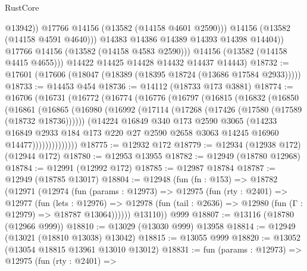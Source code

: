 \begin{lexlean}{RustCore}
\begin{coremodule}
                      @13942))
                  @17766
                  @14156
                  (@13582 (@14158 @4601 @2590)))
                @14156
                (@13582 (@14158 @4591 @4640)))
              @14383
              @14386
              @14389
              @14393
              @14398
              @14404))
          @17766
          @14156
          (@13582 (@14158 @4583 @2590)))
        @14156
        (@13582 (@14158 @4415 @4655)))
      @14422
      @14425
      @14428
      @14432
      @14437
      @14443)
@18732 := @17601 (@17606 (@18047 (@18389 (@18395 @18724 (@13686 @17584 @2933)))))
@18733 := @14453 @454
@18736 := @14112 (@18733 @173 @3881)
@18774 := @16706
    (@16731
      (@16772
        (@16774
          (@16776
            (@16797
              (@16815
                (@16832
                  (@16850
                    (@16861
                      (@16865
                        (@16980
                          (@16992
                            (@17114 (@17268 (@17426 (@17580 (@17589 (@18732 @18736))))))
                            (@14224
                              @16849
                              @340
                              @173
                              @2590
                              @3065
                              (@14233
                                @16849
                                @2933
                                @184
                                @173
                                @220
                                @27
                                @2590
                                @2658
                                @3063
                                @14245
                                @16960
                                @14477))))))))))))))
@18775 := @12932 @172
@18779 := @12934 (@12938 @172) (@12944 @172)
@18780 := @12953 @13955
@18782 := @12949 (@18780 @12968)
@18784 := @12991 (@12992 @172)
@18785 := @12987 @18784
@18787 := @12949 (@18785 @13017)
@18804 := @12948
    (fun (fn : @153) =>
    @18782
      (@12971
        (@12974
          (fun (params : @12973) =>
          @12975
            (fun (rty : @2401) =>
            @12977
              (fun (lets : @12976) =>
              @12978 (fun (tail : @2636) => @12980 (fun (Γ : @12979) => @18787 @13064))))))
        @13110))
    @999
@18807 := @13116 (@18780 (@12966 @999))
@18810 := @13029 (@13030 @999) @13958
@18814 := @12949 (@13021 (@18810 @13038) @13042)
@18815 := @13055 @999
@18820 := @13052 (@13054 @18815 @13961 @13010 @13012)
@18831 := fun (params : @12973) =>
  @12975
    (fun (rty : @2401) =>

\end{coremodule}
\end{lexlean}
